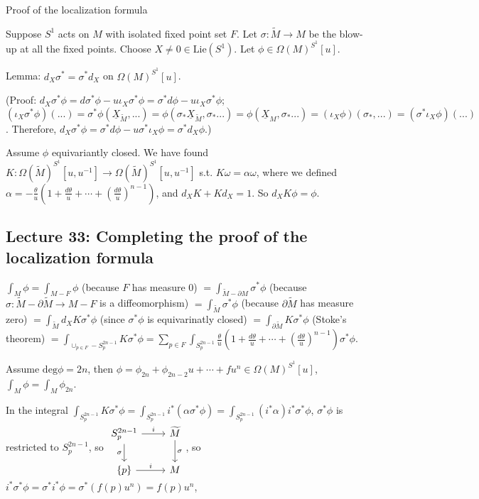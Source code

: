 \documentclass{article}
\theoremstyle{mystyle}
\theoremstyle{remark}
\numberwithin{equation}{section}
\begin{document}
Proof of the localization formula

Suppose $S^1$ acts on $M$ with isolated fixed point set $F$. Let $\sigma \colon \widetilde{M}\rightarrow M$ be the blow-up at all the fixed points. Choose $X \neq 0 \in \mathrm{Lie}(S^1)$. Let $\phi \in \Omega(M)^{S^1}[u]$.

Lemma: $d_X \sigma^* = \sigma^*d_X$ on $\Omega(M)^{S^1}[u]$.

(Proof: $d_X\sigma^*\phi = d\sigma^*\phi - u\iota_X \sigma^* \phi = \sigma^* d\phi - u \iota_X \sigma^*\phi$; $(\iota_X \sigma^*\phi)(...) = \sigma^*\phi(\underline{X}_{\widetilde{M}},...) = \phi(\sigma_* \underline{X}_{\widetilde{M}},\sigma_*...)
=\phi(\underline{X}_M,\sigma_*...)
= (\iota_X\phi)(\sigma_*,...)
= (\sigma^*\iota_X\phi)(...)$. Therefore, $d_X\sigma^*\phi = \sigma^*d\phi - u\sigma^*\iota_X\phi = \sigma^* d_X\phi$.)


Assume $\phi$ equivariantly closed. We have found $K\colon \Omega(\widetilde{M})^{S^1}[u,u^{-1}]\rightarrow \Omega(\widetilde{M})^{S^1}[u,u^{-1}]$ s.t. $K\omega = \alpha \omega$, where we defined 
$\alpha = - \frac{\theta}{u}\left(1+ \frac{d\theta}{u} + \cdots + \left(\frac{d\theta}{u}\right)^{n-1}\right)$, and $d_XK+Kd_X=1$. So $d_XK\phi = \phi$.
 
 
\subsection{Lecture 33: Completing the proof of the localization formula }


$\int_M\phi = \int_{M-F} \phi$ (because $F$ has measure 0) 
$ = \int_{\widetilde{M}-\partial M} \sigma^*\phi$ (because $\sigma\colon \widetilde{M}-\partial \widetilde{M}\rightarrow M-F$ is a diffeomorphism) $=\int_{\widetilde{M}} \sigma^*\phi$ (because $\partial \widetilde{M}$ has measure zero) $= \int_{\widetilde{M}} d_X K\sigma^*\phi$ (since $\sigma^*\phi$ is equivarinatly closed) $=\int_{\partial \widetilde{M}} K\sigma^*\phi$ (Stoke's theorem) $= \int_{\cup_{p\in F} - S_p^{2n-1}}
 K\sigma^*\phi
 = \sum_{p\in F} \int_{S^{2n-1}_p} \frac{\theta}{u}\left(1+ \frac{d \theta}{u} + \cdots + \left(\frac{d \theta}{u} \right)^{n-1}\right) \sigma^*\phi$.

Assume $\mathrm{deg}\phi=2n$, then $\phi = \phi_{2n}+\phi_{2n-2}u + \cdots + fu^n\in \Omega(M)^{S^1}[u]$, $\int_M\phi = \int_M \phi_{2n}$. 

In the integral $\int_{S^{2n-1}_p} K\sigma^*\phi = \int_{S^{2n-1}_p} i^*(\alpha\sigma^*\phi) = \int_{S^{2n-1}_p} (i^*\alpha)i^*\sigma^*\phi$, $\sigma^*\phi$ is restricted to $S^{2n-1}_p$, so 
$\begin{tikzcd} S^{2n-1}_p \ar[r,"i"]\ar[d,"\sigma"'] 
& \widetilde{M} \ar[d,"\sigma"] \\
\{p\} \ar[r,"i"] & M
\end{tikzcd}$, so $i^*\sigma^*\phi = \sigma^*i^* \phi = \sigma^*(f(p)u^n)
 = f(p)u^n$, 
 
\end{document}

